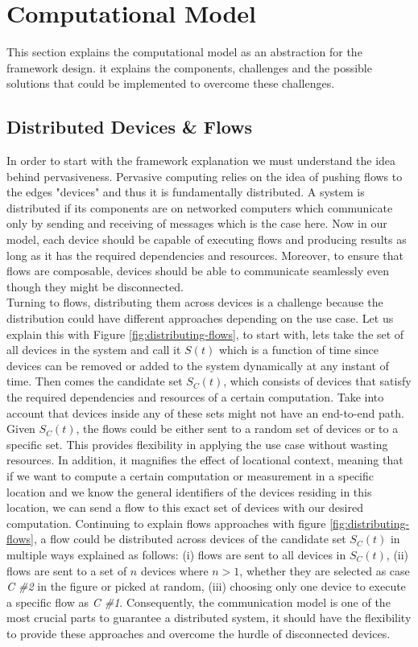 \section{Computational Model}

This section explains the computational model as an abstraction for the framework design. it explains the components, challenges and the possible solutions that could be implemented to overcome these challenges. 	

\subsection{Distributed Devices \& Flows} \label{subsec:ddf}
In order to start with the framework explanation we must understand the idea behind pervasiveness. Pervasive computing relies on the idea of pushing flows to the edges "devices" and thus it is fundamentally distributed. A system is distributed if its components  are on networked computers which communicate only by sending and receiving of messages \cite{DSYS} which is the case here. Now in our model, each device should be capable of executing flows and producing results as long as it has the required dependencies and resources. Moreover, to ensure that flows are composable, devices should be able to communicate seamlessly even though they might be disconnected.\\


\noindent Turning to flows, distributing them  across devices  is a challenge because the distribution could have different approaches depending on the use case. Let us explain this with Figure \ref{fig:distributing-flows}, to start with, lets take the set of all devices in the system and call it \(S(t)\) which is a function of time since devices can be removed or added to the system dynamically at any instant of time. Then comes the candidate set \(S_C(t)\), which consists of devices that satisfy the required dependencies and resources of a certain computation. Take into account that devices inside any of these sets might not have an end-to-end path. Given \(S_C(t)\), the flows could be either sent to a random set of devices or to a specific set. This provides flexibility in applying the use case without wasting resources. In addition, it magnifies the effect of locational context, meaning that if we want to compute a certain computation or measurement in a specific location  and we know the general identifiers of  the  devices residing in this location, we can send a flow to this exact set of devices with our desired computation. Continuing to explain flows approaches with figure \ref{fig:distributing-flows}, a flow could be distributed across devices of the candidate set  \(S_C(t)\) in multiple ways explained as follows: (i) flows are sent to all devices in  \(S_C(t)\), (ii) flows are sent to a set of  \(n\)  devices where \(n > 1\), whether they are selected as case \textit{C \#2} in the figure or picked at random, (iii) choosing only one device to execute a specific flow as \textit{C \#1}. Consequently, the communication model is one of the most crucial parts to guarantee a distributed system, it should have the flexibility to provide these approaches and overcome the hurdle of disconnected devices.
 
